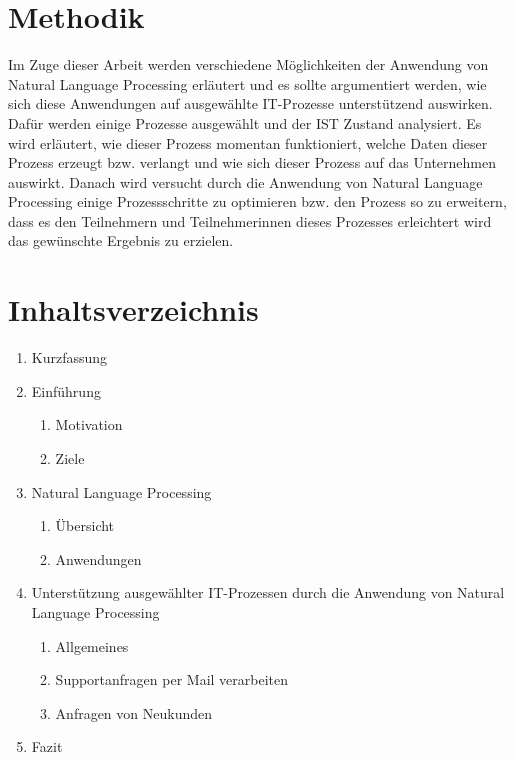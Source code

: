 \documentclass[a4paper]{scrartcl}
\begin{document}
\section{Methodik}
Im Zuge dieser Arbeit werden verschiedene Möglichkeiten der Anwendung von Natural Language Processing erläutert und es sollte argumentiert werden, wie sich diese Anwendungen auf ausgewählte IT-Prozesse unterstützend auswirken. Dafür werden einige Prozesse ausgewählt und der IST Zustand analysiert. Es wird erläutert, wie dieser Prozess momentan funktioniert, welche Daten dieser Prozess erzeugt bzw. verlangt und wie sich dieser Prozess auf das Unternehmen auswirkt. Danach wird versucht durch die Anwendung von Natural Language Processing einige Prozessschritte zu optimieren bzw. den Prozess so zu erweitern, dass es den Teilnehmern und Teilnehmerinnen dieses Prozesses erleichtert wird das gewünschte Ergebnis zu erzielen.

\section{Inhaltsverzeichnis}
\begin{enumerate}
	\item Kurzfassung
	\item Einführung
	\begin{enumerate}
			\item Motivation
			\item Ziele
	\end{enumerate}
	\item Natural Language Processing
	\begin{enumerate}
			\item Übersicht
			\item Anwendungen
	\end{enumerate}
	\item Unterstützung ausgewählter IT-Prozessen durch die Anwendung von Natural Language Processing
	\begin{enumerate}
			\item Allgemeines
			\item Supportanfragen per Mail verarbeiten
			\item Anfragen von Neukunden
	\end{enumerate}
	\item Fazit
\end{enumerate}


 
\end{document}
